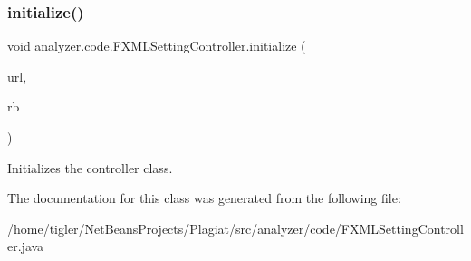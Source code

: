 \subsubsection{\texorpdfstring{initialize()}{initialize()}}
{\footnotesize\ttfamily void analyzer.\+code.\+F\+X\+M\+L\+Setting\+Controller.\+initialize (\begin{DoxyParamCaption}\item[{U\+RL}]{url,  }\item[{Resource\+Bundle}]{rb }\end{DoxyParamCaption})\hspace{0.3cm}{\ttfamily [inline]}}

Initializes the controller class. 

The documentation for this class was generated from the following file\+:\begin{DoxyCompactItemize}
\item 
/home/tigler/\+Net\+Beans\+Projects/\+Plagiat/src/analyzer/code/F\+X\+M\+L\+Setting\+Controller.\+java\end{DoxyCompactItemize}
